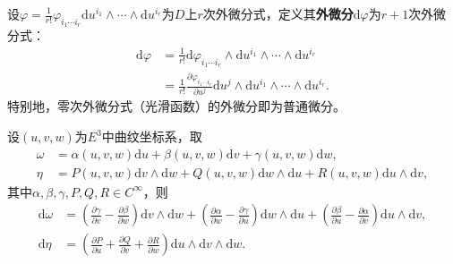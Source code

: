 \documentclass[../../main.tex]{subfiles}%
\begin{document}
\begin{definition}
设$\varphi=\frac{1}{r!}\varphi_{i_1\cdots i_r}\mathrm{d}u^{i_1}\wedge\cdots\wedge\mathrm{d}u^{i_r}$为$D$上$r$次外微分式，定义其\textbf{外微分}$\mathrm{d}\varphi$为$r+1$次外微分式：
\begin{align}
\mathrm{d}\varphi&=\frac{1}{r!}\mathrm{d}\varphi_{i_1\cdots i_r}\wedge\mathrm{d}u^{i_1}\wedge\cdots\wedge\mathrm{d}u^{i_r}\nonumber\\
&=\frac{1}{r!}\frac{\partial\varphi_{i_1\cdots i_r}}{\partial u^j}\mathrm{d}u^j\wedge\mathrm{d}u^{i_1}\wedge\cdots\wedge\mathrm{d}u^{i_r}.
\label{eq:exterior_derivative}
\end{align}
特别地，零次外微分式（光滑函数）的外微分即为普通微分。
\end{definition}

\begin{example}
设$(u,v,w)$为$E^3$中曲纹坐标系，取
\begin{align*}
\omega&=\alpha(u,v,w)\mathrm{d}u+\beta(u,v,w)\mathrm{d}v+\gamma(u,v,w)\mathrm{d}w,\\
\eta&=P(u,v,w)\mathrm{d}v\wedge\mathrm{d}w+Q(u,v,w)\mathrm{d}w\wedge\mathrm{d}u+R(u,v,w)\mathrm{d}u\wedge\mathrm{d}v,
\end{align*}
其中$\alpha,\beta,\gamma,P,Q,R\in C^\infty$，则
\begin{align*}
\mathrm{d}\omega&=\left(\frac{\partial\gamma}{\partial v}-\frac{\partial\beta}{\partial w}\right)\mathrm{d}v\wedge\mathrm{d}w+\left(\frac{\partial\alpha}{\partial w}-\frac{\partial\gamma}{\partial u}\right)\mathrm{d}w\wedge\mathrm{d}u+\left(\frac{\partial\beta}{\partial u}-\frac{\partial\alpha}{\partial v}\right)\mathrm{d}u\wedge\mathrm{d}v,\\
\mathrm{d}\eta&=\left(\frac{\partial P}{\partial u}+\frac{\partial Q}{\partial v}+\frac{\partial R}{\partial w}\right)\mathrm{d}u\wedge\mathrm{d}v\wedge\mathrm{d}w.
\end{align*}
\end{example}
\end{document}
